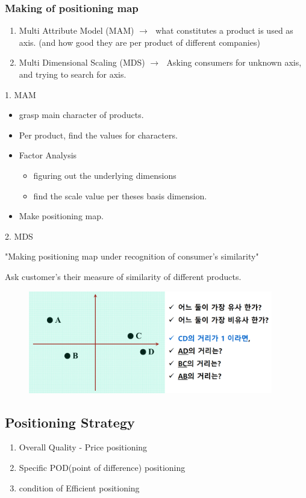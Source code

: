 \documentclass[12pt]{article}
\newcommand{\ra}{$\rightarrow \text{ }$}
\begin{document}
\subsubsection{Making of positioning map}
\begin{enumerate}
	\item Multi Attribute Model (MAM)
	\ra what constitutes a product is used as axis. (and how good they are per product of different companies)
	\item Multi Dimensional Scaling (MDS)
	\ra Asking consumers for unknown axis, and trying to search for axis.
\end{enumerate}

1. MAM
\begin{itemize}
	\item grasp main character of products.
	\item Per product, find the values for characters.
	\item Factor Analysis
	\begin{itemize}
		\item figuring out the underlying dimensions
		\item find the scale value per theses basis dimension.
	\end{itemize}
	\item  Make positioning map.
\end{itemize}

2. MDS
\begin{tcolorbox}
	"Making positioning map under recognition of consumer's similarity"

\end{tcolorbox}
Ask customer's their measure of similarity of different products.

\begin{figure}[H]
	\centering
	\includegraphics[width=0.95\textwidth]{img/mds.png}
	\caption{}
	\label{}
\end{figure}

\subsection{Positioning Strategy}
\begin{enumerate}
	\item Overall Quality - Price positioning
	\item Specific POD(point of difference) positioning
	\item condition of Efficient positioning
\end{enumerate}
\end{document}
